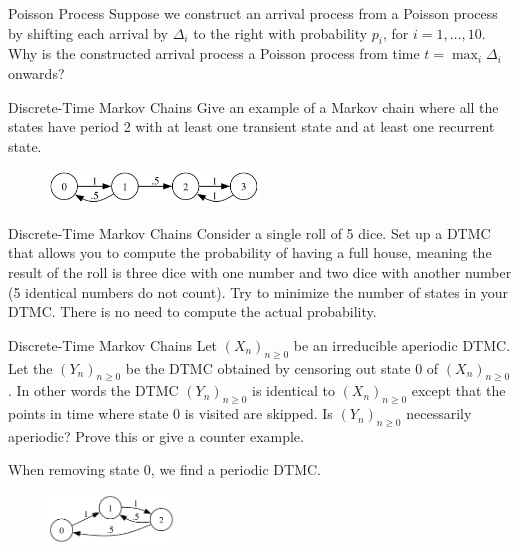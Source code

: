 \begin{problem}{Poisson Process}
Suppose we construct an arrival process from a Poisson process by shifting each arrival by $\Delta_i$ to the right with probability $p_i$, for $i = 1, \ldots, 10$. Why is the constructed arrival process a Poisson process from time $t = \max_i \Delta_i$ onwards?
\end{problem}

\begin{problem}{Discrete-Time Markov Chains}
Give an example of a Markov chain where all the states have period 2 with at least one transient state and at least one recurrent state.
\end{problem}

\begin{solution}
  \begin{figure}[h!]
    \begin{center}
      \includegraphics[width=0.5\textwidth]{img/24.2.png}
    \end{center}
  \end{figure}
\end{solution}

\begin{problem}{Discrete-Time Markov Chains}
Consider a single roll of 5 dice. Set up a DTMC that allows you to compute the probability of having a full house, meaning the result of the roll is three dice with one number and two dice with another number (5 identical numbers do not count). Try to minimize the number of states in your DTMC. There is no need to compute the actual probability.
\end{problem}
\begin{problem}{Discrete-Time Markov Chains}
  Let $(X_n)_{n\geq 0}$ be an irreducible aperiodic DTMC. Let the $(Y_n)_{n\geq0}$ be the DTMC obtained by censoring out state 0 of $(X_n)_{n\geq 0}$. In other words the DTMC $(Y_n)_{n\geq0}$ is identical to $(X_n)_{n\geq0}$ except that the points in time where state 0 is visited are skipped. Is $(Y_n)_{n\geq0}$ necessarily aperiodic? Prove this or give a counter example.
\end{problem}
\begin{solution}
  When removing state 0, we find a periodic DTMC.

  \begin{figure}[h!]
    \begin{center}
      \includegraphics[width=0.3\textwidth]{img/24.4.png}
    \end{center}
  \end{figure}

\end{solution}

